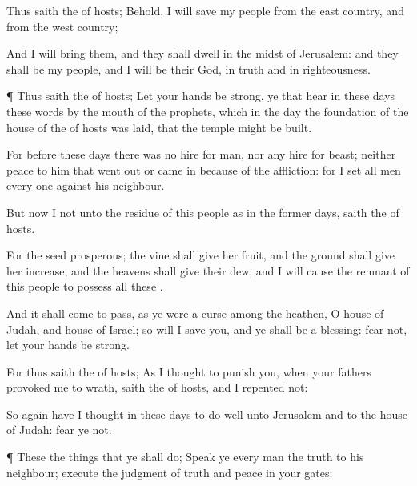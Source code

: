 {Thus
saith the
{} of
hosts; Behold, I will
save my
people from the
east
country, and from the
west
country;

And I will
bring them, and they shall
dwell in the
midst of
Jerusalem: and they shall be my
people, and I will be their
God, in
truth and in
righteousness.


\par }{\PP {}¶ Thus
saith the
{} of
hosts; Let your
hands be
strong, ye that
hear in these
days these
words by the
mouth of the
prophets, which
{} in the
day
{} the
foundation of the
house of the
{} of
hosts was
laid, that the
temple might be
built.

For
before these
days there
was no
hire for
man, nor any
hire for
beast; neither
{}
peace to him that went
out or came
in because of the
affliction: for I
set all
men every
one against his
neighbour.

But now I
{} not
{} unto the
residue of this
people as in the
former
days,
saith the
{} of
hosts.

For the
seed
{}
prosperous; the
vine shall
give her
fruit, and the
ground shall
give her
increase, and the
heavens shall
give their
dew; and I will cause the
remnant of this
people to
possess all these
{}.

And it shall come to pass,
{} as ye were a
curse among the
heathen, O
house of
Judah, and
house of
Israel; so will I
save you, and ye shall be a
blessing:
fear not,
{} let your
hands be
strong.

For thus
saith the
{} of
hosts; As I
thought to
punish you, when your
fathers provoked me to
wrath,
saith the
{} of
hosts, and I
repented not:

So
again have I
thought in these
days to do
well unto
Jerusalem and to the
house of
Judah:
fear ye not.


\par }{\PP {}¶ These
{} the
things that ye shall
do;
Speak ye every
man the
truth to his
neighbour;
execute the
judgment of
truth and
peace in your
gates:

}
